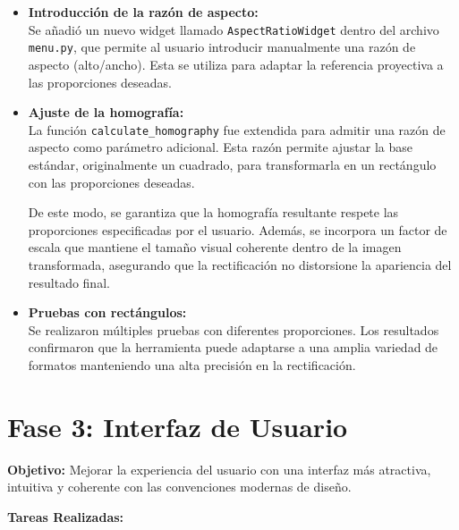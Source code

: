 \begin{itemize}
    \item \textbf{Introducción de la razón de aspecto:} \\
    Se añadió un nuevo widget llamado \texttt{AspectRatioWidget} dentro del archivo \texttt{menu.py}, que permite al usuario introducir manualmente una razón de aspecto (alto/ancho). Esta se utiliza para adaptar la referencia proyectiva a las proporciones deseadas.
    
    \item \textbf{Ajuste de la homografía:} \\
    La función \texttt{calculate\_homography} fue extendida para admitir una razón de aspecto como parámetro adicional. Esta razón permite ajustar la base estándar, originalmente un cuadrado, para transformarla en un rectángulo con las proporciones deseadas.
    
    De este modo, se garantiza que la homografía resultante respete las proporciones especificadas por el usuario. Además, se incorpora un factor de escala que mantiene el tamaño visual coherente dentro de la imagen transformada, asegurando que la rectificación no distorsione la apariencia del resultado final.
    
    \item \textbf{Pruebas con rectángulos:} \\
    Se realizaron múltiples pruebas con diferentes proporciones. Los resultados confirmaron que la herramienta puede adaptarse a una amplia variedad de formatos manteniendo una alta precisión en la rectificación.
\end{itemize}

\section{Fase 3: Interfaz de Usuario}

\textbf{Objetivo:} Mejorar la experiencia del usuario con una interfaz más atractiva, intuitiva y coherente con las convenciones modernas de diseño.

\textbf{Tareas Realizadas:}

